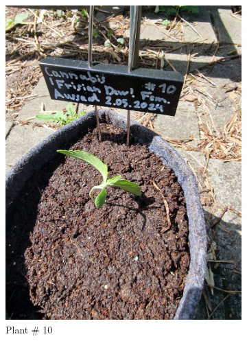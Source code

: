 \begin{figure}[htbp]
\begin{subfigure}[t]{.19\textwidth}
        \includegraphics[width=\linewidth]{plant_10_2024-05-13}
        \caption{Plant \# 10}
        \label{fig:plant_10_2024-05-13}
    \end{subfigure}
    \begin{subfigure}[t]{.19\textwidth}

\end{subfigure}
\end{figure}
